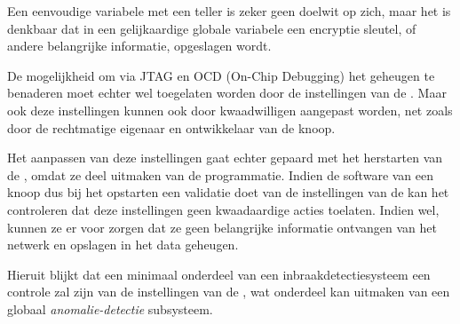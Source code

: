 Een eenvoudige variabele met een teller is zeker geen doelwit op zich, maar het
is denkbaar dat in een gelijkaardige globale variabele een encryptie sleutel,
of andere belangrijke informatie, opgeslagen wordt.

De mogelijkheid om via JTAG en OCD (On-Chip Debugging) het geheugen te
benaderen moet echter wel toegelaten worden door de instellingen van de \mcu.
Maar ook deze instellingen kunnen ook door kwaadwilligen aangepast worden, net
zoals door de rechtmatige eigenaar en ontwikkelaar van de knoop.

Het aanpassen van deze instellingen gaat echter gepaard met het herstarten van
de \mcu, omdat ze deel uitmaken van de programmatie. Indien de software van een
knoop dus bij het opstarten een validatie doet van de instellingen van de \mcu
kan het controleren dat deze instellingen geen kwaadaardige acties toelaten.
Indien wel, kunnen ze er voor zorgen dat ze geen belangrijke informatie
ontvangen van het netwerk en opslagen in het data geheugen.

Hieruit blijkt dat een minimaal onderdeel van een inbraakdetectiesysteem een
controle zal zijn van de instellingen van de \mcu, wat onderdeel kan uitmaken
van een globaal \emph{anomalie-detectie} subsysteem.
